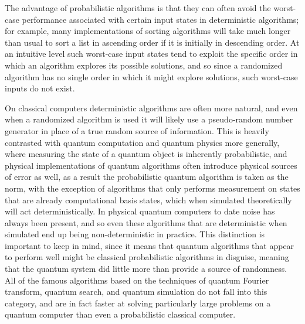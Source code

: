 The advantage of probabilistic algorithms is that they can often avoid the worst-case performance associated with certain input states in deterministic algorithms; for example, many implementations of sorting algorithms will take much longer than usual to sort a list in ascending order if it is initially in descending order. At an intuitive level such worst-case input states tend to exploit the specific order in which an algorithm explores its possible solutions, and so since a randomized algorithm has no single order in which it might explore solutions, such worst-case inputs do not exist.

On classical computers deterministic algorithms are often more natural, and even when a randomized algorithm is used it will likely use a pseudo-random number generator in place of a true random source of information. This is heavily contrasted with quantum computation and quantum physics more generally, where measuring the state of a quantum object is inherently probabilistic, and physical implementations of quantum algorithms often introduce physical sources of error as well, as a result the probabilistic quantum algorithm is taken as the norm, with the exception of algorithms that only performs measurement on states that are already computational basis states, which when simulated theoretically will act deterministically. In physical quantum computers to date noise has always been present, and so even these algorithms that are deterministic when simulated end up being non-deterministic in practice. This distinction is important to keep in mind, since it means that quantum algorithms that appear to perform well might be classical probabilistic algorithms in disguise, meaning that the quantum system did little more than provide a source of randomness. All of the famous algorithms based on the techniques of quantum Fourier transform, quantum search, and quantum simulation do not fall into this category, and are in fact faster at solving particularly large problems on a quantum computer than even a probabilistic classical computer.

